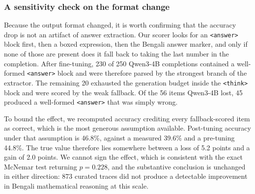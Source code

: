 \subsubsection*{A sensitivity check on the format change}

Because the output format changed, it is worth confirming that the accuracy
drop is not an artifact of answer extraction. Our scorer looks for an
\texttt{<answer>} block first, then a boxed expression, then the Bengali answer
marker, and only if none of those are present does it fall back to taking the
last number in the completion. After fine-tuning, 230 of 250 Qwen3-4B
completions contained a well-formed \texttt{<answer>} block and were therefore
parsed by the strongest branch of the extractor. The remaining 20 exhausted the
generation budget inside the \texttt{<think>} block and were scored by the weak
fallback. Of the 56 items Qwen3-4B lost, 45 produced a well-formed
\texttt{<answer>} that was simply wrong.

To bound the effect, we recomputed accuracy crediting every fallback-scored
item as correct, which is the most generous assumption available. Post-tuning
accuracy under that assumption is 46.8\%, against a measured 39.6\% and a
pre-tuning 44.8\%. The true value therefore lies somewhere between a loss of
5.2 points and a gain of 2.0 points. We cannot sign the effect, which is
consistent with the exact McNemar test returning $p=0.228$, and the substantive
conclusion is unchanged in either direction: 873 curated traces did not produce
a detectable improvement in Bengali mathematical reasoning at this scale.
